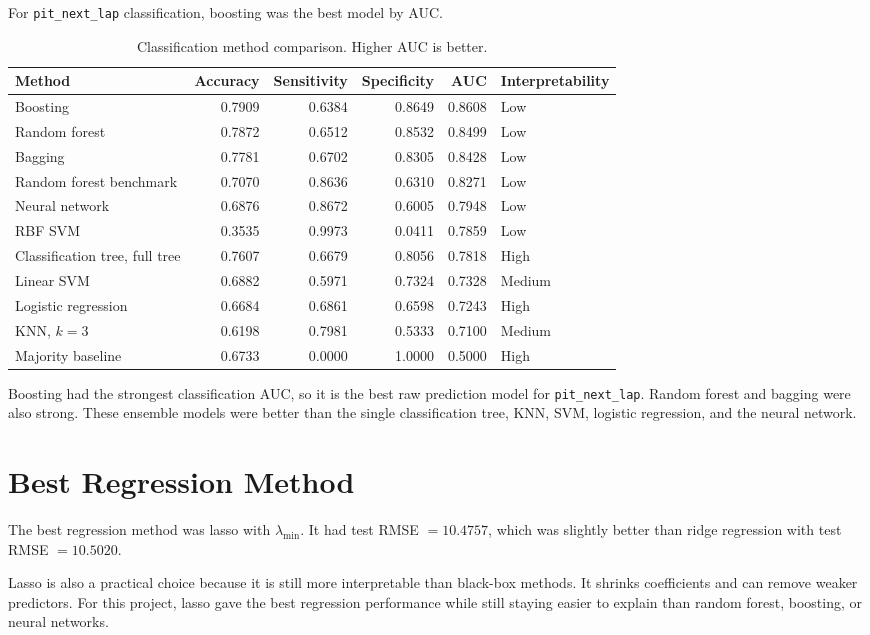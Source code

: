 \documentclass[11pt,oneside,openany]{book}
\begin{document}
For \texttt{pit\_next\_lap} classification, boosting was the best model by AUC.

\begin{table}[H]
\centering
\small
\caption{Classification method comparison. Higher AUC is better.}
\begin{tabular}{lrrrrl}
\toprule
Method & Accuracy & Sensitivity & Specificity & AUC & Interpretability\\
\midrule
Boosting & 0.7909 & 0.6384 & 0.8649 & 0.8608 & Low\\
Random forest & 0.7872 & 0.6512 & 0.8532 & 0.8499 & Low\\
Bagging & 0.7781 & 0.6702 & 0.8305 & 0.8428 & Low\\
Random forest benchmark & 0.7070 & 0.8636 & 0.6310 & 0.8271 & Low\\
Neural network & 0.6876 & 0.8672 & 0.6005 & 0.7948 & Low\\
RBF SVM & 0.3535 & 0.9973 & 0.0411 & 0.7859 & Low\\
Classification tree, full tree & 0.7607 & 0.6679 & 0.8056 & 0.7818 & High\\
Linear SVM & 0.6882 & 0.5971 & 0.7324 & 0.7328 & Medium\\
Logistic regression & 0.6684 & 0.6861 & 0.6598 & 0.7243 & High\\
KNN, \(k=3\) & 0.6198 & 0.7981 & 0.5333 & 0.7100 & Medium\\
Majority baseline & 0.6733 & 0.0000 & 1.0000 & 0.5000 & High\\
\bottomrule
\end{tabular}
\end{table}

Boosting had the strongest classification AUC, so it is the best raw prediction model for \texttt{pit\_next\_lap}. Random forest and bagging were also strong. These ensemble models were better than the single classification tree, KNN, SVM, logistic regression, and the neural network.

\section{Best Regression Method}

The best regression method was lasso with \(\lambda_{\min}\). It had test RMSE \(=10.4757\), which was slightly better than ridge regression with test RMSE \(=10.5020\).

Lasso is also a practical choice because it is still more interpretable than black-box methods. It shrinks coefficients and can remove weaker predictors. For this project, lasso gave the best regression performance while still staying easier to explain than random forest, boosting, or neural networks.
\end{document}
